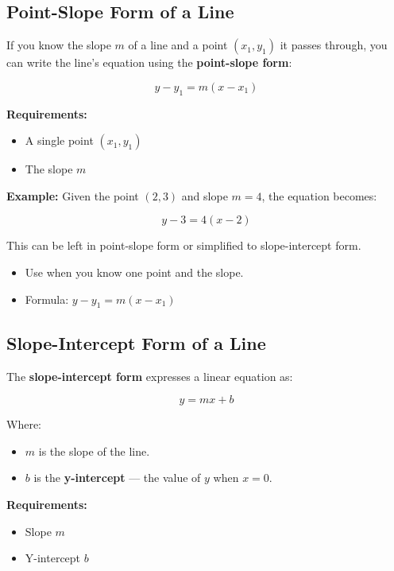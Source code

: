 \documentclass[11pt]{article}
\begin{document}
\subsection{Point-Slope Form of a Line}

If you know the slope \( m \) of a line and a point \( (x_1, y_1) \) it passes through, you can write the line's equation using the \textbf{point-slope form}:

\[
y - y_1 = m(x - x_1)
\]

\textbf{Requirements:}
\begin{itemize}
  \item A single point \( (x_1, y_1) \)
  \item The slope \( m \)
\end{itemize}

\textbf{Example:}
Given the point \( (2, 3) \) and slope \( m = 4 \), the equation becomes:

\[
y - 3 = 4(x - 2)
\]

This can be left in point-slope form or simplified to slope-intercept form.

\begin{tcolorbox}[colback=cyan!5!white, colframe=cyan!80!black, title=Point-Slope Summary]
\begin{itemize}
  \item Use when you know one point and the slope.
  \item Formula: \( y - y_1 = m(x - x_1) \)
\end{itemize}
\end{tcolorbox}

\subsection{Slope-Intercept Form of a Line}

The \textbf{slope-intercept form} expresses a linear equation as:

\[
y = mx + b
\]

Where:
\begin{itemize}
  \item \( m \) is the slope of the line.
  \item \( b \) is the \textbf{y-intercept} — the value of \( y \) when \( x = 0 \).
\end{itemize}

\textbf{Requirements:}
\begin{itemize}
  \item Slope \( m \)
  \item Y-intercept \( b \)
\end{itemize}
\end{document}
